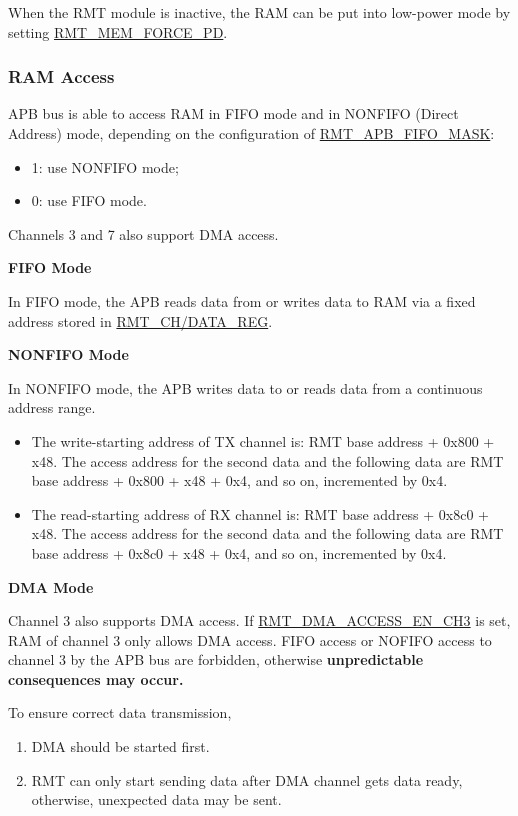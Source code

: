 \documentclass[main\_\_EN.tex]{subfiles}
\begin{document}
When the RMT module is inactive, the RAM can be put into low-power mode by setting  \hyperref[fielddesc:RMTMEMFORCEPD]{RMT\_MEM\_FORCE\_PD}.

\subsubsection{RAM Access}

APB bus is able to access RAM in FIFO mode and in NONFIFO (Direct Address) mode, depending on the configuration of \hyperref[fielddesc:RMTAPBFIFOMASK]{RMT\_APB\_FIFO\_MASK}:

\begin{itemize}
    \item 1: use NONFIFO mode;
    \item 0: use FIFO mode.
\end{itemize}

Channels 3 and 7 also support DMA access.

\textbf{FIFO Mode}

In FIFO mode, the APB reads data from or writes data to RAM via a fixed address stored in \hyperref[regdesc:RMTCHNDATAREG]{RMT\_CH/DATA\_REG}.

\textbf{NONFIFO Mode}

In NONFIFO mode, the APB writes data to or reads data from a continuous address range.
\begin{itemize}
    \item The write-starting address of TX channel   is: RMT base address + 0x{}800 + x48. The access address for the second data and the following data are RMT base address + 0x{}800 + x48 + 0x{}4, and so on, incremented by 0x{}4.
    \item The read-starting address of RX channel   is: RMT base address + 0x{}8c0 + x48. The access address for the second data and the following data are RMT base address + 0x{}8c0 + x48 + 0x{}4, and so on, incremented by 0x{}4.
\end{itemize}

\textbf{DMA Mode}

Channel 3 also supports DMA access. If \hyperref[fielddesc:RMTDMAACCESSENCH3]{RMT\_DMA\_ACCESS\_EN\_CH3} is set, RAM of channel 3 only allows DMA access. FIFO access or NOFIFO access to channel 3 by the APB bus are forbidden, otherwise \textbf{unpredictable consequences may occur.}

To ensure correct data transmission,
\begin{enumerate}
    \item DMA should be started first.
    \item RMT can only start sending data after DMA channel gets data ready, otherwise, unexpected data may be sent.
\end{enumerate}
\end{document}
